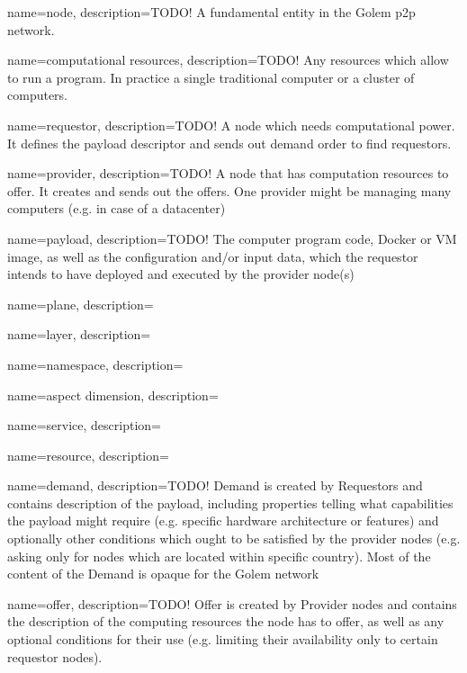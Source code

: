 {
        name=node,
        description={TODO! A fundamental entity in the Golem p2p network.}
}

{
        name=computational resources,
        description={TODO! Any resources which allow to run a program. 
					In practice a single traditional computer or a cluster of computers.}
}

{
        name=requestor,
        description={TODO! A node which needs computational power. It defines the payload descriptor 
					and sends out demand order to find requestors.}
}

{
        name=provider,
        description={TODO! A node that has computation resources to offer. It creates and sends out the offers. 
					One provider might be managing many computers (e.g. in case of a datacenter)}
}

{
        name=payload,
        description={TODO! The computer program code, Docker or VM image, as well as the
					configuration and/or input data, which the requestor intends to have deployed
					and executed by the provider node(s)}
}

{
        name=plane,
        description={}
}

{
        name=layer,
        description={}
}

{
        name=namespace,
        description={}
}

{
        name=aspect dimension,
        description={}
}

{
        name=service,
        description={}
}

{
        name=resource,
        description={}
}

{
        name=demand,
        description={TODO! Demand is created by Requestors and contains description of the
					payload, including properties telling what capabilities the payload might
					require (e.g. specific hardware architecture or features) and optionally other
					conditions which ought to be satisfied by the provider nodes (e.g. asking only
					for nodes which are located within specific country). Most of the content of the
					Demand is opaque for the Golem network}
}

{
        name=offer,
        description={TODO! Offer is created by Provider nodes and contains the description of the
					computing resources the node has to offer, as well as any optional conditions
					for their use (e.g. limiting their availability only to certain requestor
					nodes).}
}

